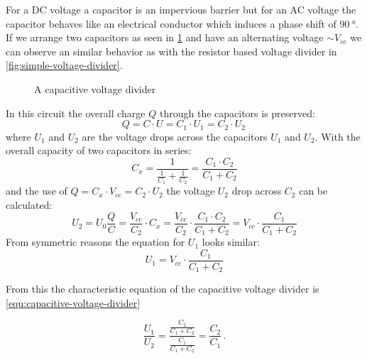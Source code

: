 For a DC voltage a capacitor is an impervious barrier but for an AC voltage the capacitor behaves like an electrical conductor which induces a phase shift of $\SI{90}{\degree}$. If we arrange two capacitors as seen in \cref{fig:capacitive-voltage-divider} and have an alternating voltage $\sim V_{cc}$ we can observe an similar behavior as with the resistor based voltage divider in \cref{fig:simple-voltage-divider}.


\begin{figure}[htb]
	\centering
	\caption{A capacitive voltage divider}
	\label{fig:capacitive-voltage-divider}
\end{figure}


In this circuit the overall charge $Q$ through the capacitors is preserved:
\begin{equation*}
	Q = C \cdot U = C_1 \cdot U_1 = C_2 \cdot U_2\,
\end{equation*}
where $U_1$ and $U_2$ are the voltage drops across the capacitors $U_1$ and $U_2$. With the overall capacity of two capacitors in series:
\begin{equation*}
	C_x = \frac{1}{\frac{1}{C_1} + \frac{1}{C_2}} = \frac{C_1 \cdot C_2}{C_1 + C_2}
\end{equation*}
and the use of $Q = C_x \cdot V_{cc} = C_2 \cdot U_2$ the voltage $U_2$ drop across $C_2$ can be calculated:
\begin{equation*}
	U_2 = U_0 \frac{Q}{C} =  \frac{V_{cc}}{C_2} \cdot C_x = \frac{V_{cc}}{C_2} \cdot \frac{C_1 \cdot C_2}{C_1 + C_2} = V_{cc} \cdot \frac{C_1}{C_1 + C_2}
\end{equation*}
From symmetric reasons the equation for $U_1$ looks similar:
\begin{equation*}
	U_1 =  V_{cc} \cdot \frac{C_1}{C_1 + C_2}
\end{equation*}

From this the characteristic equation of the capacitive voltage divider is \cref{equ:capacitive-voltage-divider}

\begin{equation}
	\frac{U_1}{U_2} = \frac{ \frac{C_2}{C_1 + C_2}  }{ \frac{C_1}{C_1 + C_2}  } = \frac{C_2}{C_1}\,.
	\label{equ:capacitive-voltage-divider}
\end{equation}

